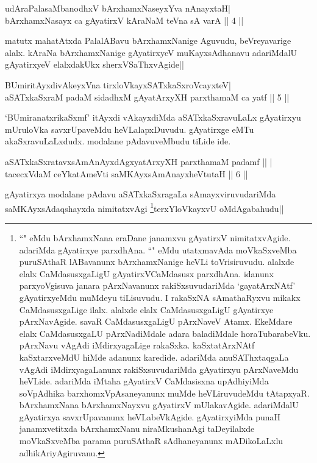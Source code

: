 \begin{shl}
udAraPalasaMbanodhxV bArxhamxNaseyxYva nAnayxtaH| \\
bArxhamxNasayx ca gAyatirxV kAraNaM teVna sA varA \hfill ||  4 || 
\end{shl}

\begin{artha} 
matutx mahatAtxda PalalABavu bArxhamxNanige Aguvudu, beVreyavarige 
alalx. kAraNa bArxhamxNanige gAyatirxyeV muKayxsAdhanavu adariMdalU 
gAyatirxyeV elalxdakUkx sherxVSaThxvAgide||
\end{artha}

\begin{shl}
BUmiritAyxdivAkeyxVna tirxloVkayxSATxkaSxroVcayxteV| \\
aSATxkaSxraM padaM sidadhxM gAyatArxyXH parxthamaM ca yatf \hfill ||  5 || 
\end{shl}

\begin{artha} 
`BUmiranatxrikaSxmf' itAyxdi vAkayxdiMda aSATxkaSxravuLaLx gAyatirxyu 
mUruloVka savxrUpaveMdu heVLalapxDuvudu. gAyatirxge eMTu 
akaSxravuLaLxdudx. modalane pAdavuveMbudu tiLide ide.
\end{artha}

\begin{shl}
aSATxkaSxratavxsAmAnAyxdAgxyatArxyXH parxthamaM padamf \hfill ||  | \\
tacecxVdaM ceYkatAmeVti saMKAyxsAmAnayxheVtutaH \hfill ||  6 || 
\end{shl}

\begin{artha} 
gAyatirxya modalane pAdavu aSATxkaSxragaLa sAmayxviruvudariMda 
saMKAyxsAdaqshayxda nimitatxvAgi \footnote[1]{``\stext" eMdu 
bArxhamxNana eraDane janamxvu gAyatirxV nimitatxvAgide. adariMda 
gAyatirxye parxdhAna. ``\stext" eMdu utatxmavAda moVkaSxveMba 
puruSAthaR lABavanunx bArxhamxNanige heVLi toVrisiruvudu. alalxde 
elalx CaMdasusxgaLigU gAyatirxVCaMdasusx parxdhAna. idanunx 
parxyoVgisuva janara pArxNavanunx rakiSxsuvudariMda `gayatArxNAtf' 
gAyatirxyeMdu muMdeyu tiLisuvudu. I rakaSxNA sAmathaRyxvu mikakx 
CaMdasusxgaLige ilalx. alalxde elalx CaMdasusxgaLigU gAyatirxye 
pArxNavAgide. savaR CaMdasusxgaLigU pArxNaveV Atamx. EkeMdare elalx 
CaMdasusxgaLU pArxNadiMdale adara baladiMdale horaTubarabeVku. 
pArxNavu vAgAdi iMdirxyagaLige rakaSxka. kaSxtatArxNAtf kaSxtarxveMdU 
hiMde adanunx karedide. adariMda anuSAThxtaqgaLa vAgAdi 
iMdirxyagaLanunx rakiSxsuvudariMda gAyatirxyu pArxNaveMdu heVLide. 
adariMda iMtaha gAyatirxV CaMdasisxna upAdhiyiMda soVpAdhika 
barxhomxVpAsaneyanunx muMde heVLiruvudeMdu tAtapxyaR. bArxhamxNana 
bArxhamxNayxvu gAyatirxV mUlakavAgide. adariMdalU gAyatirxya 
savxrUpavanunx heVLabeVkAgide. gAyatirxyiMda punaH janamxvetitxda 
bArxhamxNanu niraMkushanAgi taDeyilalxde moVkaSxveMba parama 
puruSAthaR sAdhaneyanunx mADikoLaLxlu adhikAriyAgiruvanu.}terxYloVkayxvU 
oMdAgabahudu||
\end{artha}

